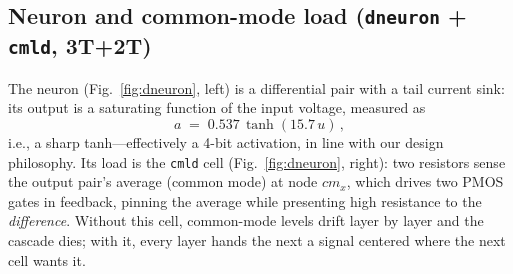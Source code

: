 \documentclass[11pt]{article}
\begin{document}
\subsection{Neuron and common-mode load (\texttt{dneuron} + \texttt{cmld}, 3T+2T)}

The neuron (Fig.~\ref{fig:dneuron}, left) is a differential pair with a tail current sink: its output is a saturating function of the input voltage, measured as
\[
a \;=\; 0.537\,\tanh(15.7\,u)\,,
\]
i.e., a sharp tanh---effectively a 4-bit activation, in line with our design philosophy. Its load is the \texttt{cmld} cell (Fig.~\ref{fig:dneuron}, right): two resistors sense the output pair's average (common mode) at node $cm_x$, which drives two PMOS gates in feedback, pinning the average while presenting high resistance to the \emph{difference}. Without this cell, common-mode levels drift layer by layer and the cascade dies; with it, every layer hands the next a signal centered where the next cell wants it.
\end{document}
